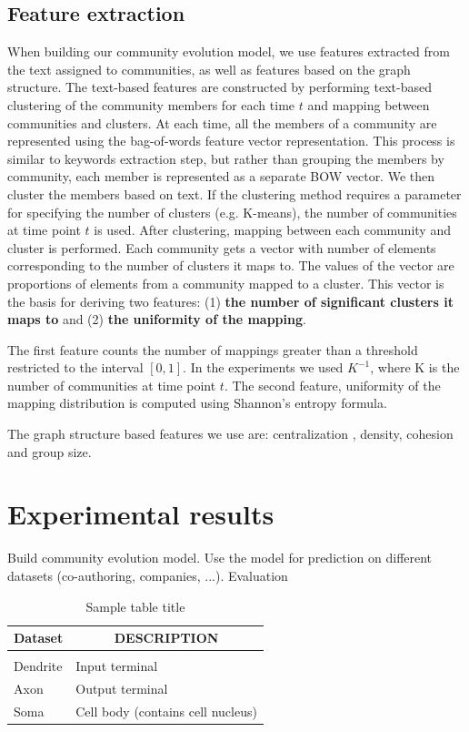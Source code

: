\documentclass{article} %
\begin{document}
\subsection{Feature extraction}
When building our community evolution model, we use features extracted from the text assigned to communities, as well as features based on  the graph structure. The text-based features are constructed by performing text-based clustering of the community members for each time $t$ and mapping between communities and clusters. At each time,  all the members of a  community are represented using the bag-of-words feature vector representation. This process is similar to keywords extraction step, but rather than grouping the members by community, each member is represented as a separate BOW vector.  We then cluster the members based on text. If the clustering method requires a parameter for specifying the number of clusters (e.g. K-means), the number of communities at time point $t$ is used. After clustering, mapping between each community and cluster is performed. Each community gets a vector with number of elements corresponding to the number of clusters it maps to. The values of the vector are proportions of elements from a community mapped to a cluster. This vector is the basis for deriving two features: (1) {\bf the number of significant clusters it maps to} and (2) { \bf the uniformity of the mapping}.

The first feature counts the number of mappings greater than a threshold restricted to the interval $[0, 1]$. In the experiments we used $K^{-1}$, where K is  the number of communities at time point $t$. The second feature, uniformity of the mapping distribution is computed  using Shannon's entropy formula.

The graph structure based features we use are: centralization \cite{freeman1978}, density\cite{wasserman1994}, cohesion and group size.

\section{Experimental results}
Build community evolution model.
Use the model for prediction on different datasets (co-authoring, companies, ...). Evaluation

\begin{table}[t]
\caption{Sample table title}
\label{sample-table}
\begin{center}
\begin{tabular}{ll}
\multicolumn{1}{c}{\bf Dataset}  &\multicolumn{1}{c}{\bf DESCRIPTION}
\\ \hline \\
Dendrite         &Input terminal \\
Axon             &Output terminal \\
Soma             &Cell body (contains cell nucleus) \\
\end{tabular}
\end{center}
\end{table}
\end{document}
